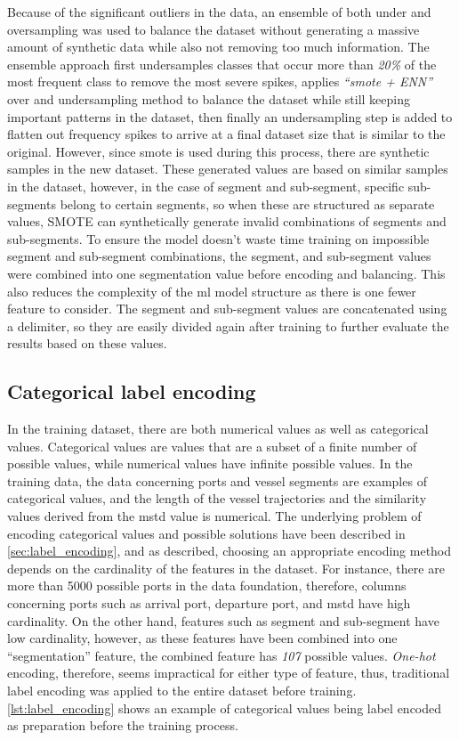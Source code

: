 Because of the significant outliers in the data, an ensemble of both under and oversampling was used to balance the dataset without generating a massive amount of synthetic data while also not removing too much information. The ensemble approach first undersamples classes that occur more than \textit{20\%} of the most frequent class to remove the most severe spikes, applies \textit{``\acrshort{smote} + ENN''} over and undersampling method to balance the dataset while still keeping important patterns in the dataset, then finally an undersampling step is added to flatten out frequency spikes to arrive at a final dataset size that is similar to the original. However, since \acrshort{smote} is used during this process, there are synthetic samples in the new dataset. These generated values are based on similar samples in the dataset, however, in the case of segment and sub-segment, specific sub-segments belong to certain segments, so when these are structured as separate values, SMOTE can synthetically generate invalid combinations of segments and sub-segments. To ensure the model doesn't waste time training on impossible segment and sub-segment combinations, the segment, and sub-segment values were combined into one segmentation value before encoding and balancing. This also reduces the complexity of the \acrshort{ml} model structure as there is one fewer feature to consider. The segment and sub-segment values are concatenated using a delimiter, so they are easily divided again after training to further evaluate the results based on these values.

\subsection{Categorical label encoding}

In the training dataset, there are both numerical values as well as categorical values. Categorical values are values that are a subset of a finite number of possible values, while numerical values have infinite possible values. In the training data, the data concerning ports and vessel segments are examples of categorical values, and the length of the vessel trajectories and the similarity values derived from the \acrshort{mstd} value is numerical. The underlying problem of encoding categorical values and possible solutions have been described in \cref{sec:label_encoding}, and as described, choosing an appropriate encoding method depends on the cardinality of the features in the dataset. For instance, there are more than 5000 possible ports in the data foundation, therefore, columns concerning ports such as arrival port, departure port, and \acrshort{mstd} have high cardinality. On the other hand, features such as segment and sub-segment have low cardinality, however, as these features have been combined into one ``segmentation'' feature, the combined feature has \textit{107} possible values. \textit{One-hot} encoding, therefore, seems impractical for either type of feature, thus, traditional label encoding was applied to the entire dataset before training. \cref{lst:label_encoding} shows an example of categorical values being label encoded as preparation before the training process.

